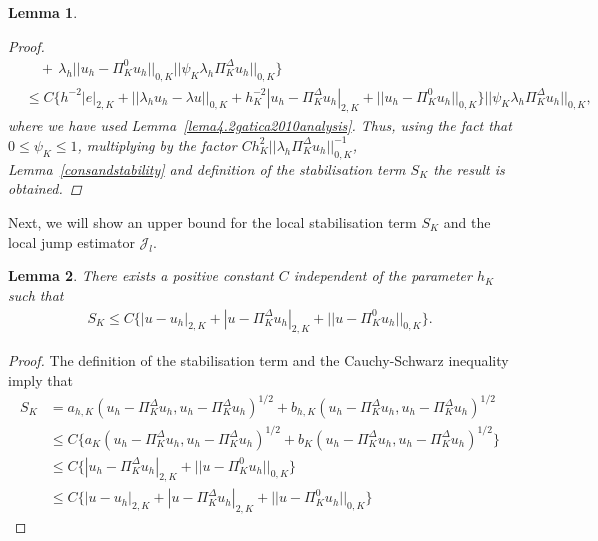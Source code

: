 \documentclass[final,reqno]{elsarticle}
\newtheorem{lemma}{Lemma}[section]
\def\PiK{\Pi_{K}^{\Delta}}
\begin{document}
\begin{lemma}
\begin{proof}
\begin{align}
			&\quad +\, \lambda_h ||u_h-\Pi_K^0 u_h ||_{0,K}||\psi_K \lambda_h \PiK u_h ||_{0,K}\Big\}\nonumber\\
			&\leq C\Big\{h^{-2}|e|_{2,K}+||\lambda_hu_h-\lambda u ||_{0,K}+h_K^{-2} |u_h-\PiK u_h|_{2,K}+||u_h-\Pi_K^0 u_h ||_{0,K}  \Big\}|| \psi_K\lambda_h\PiK u_h||_{0,K},\nonumber
		\end{align}
where we have used Lemma~\ref{lema4.2gatica2010analysis}. Thus, using the fact that $0\leq  \psi_K\leq 1$, multiplying by the factor $Ch_K^2||\lambda_h \PiK u_h ||_{0,K}^{-1}$, Lemma~\ref{consandstability} and definition of the stabilisation term $S_K$ the result is  obtained.
	\end{proof}
\end{lemma}

Next, we will show an upper bound for the local stabilisation term $S_K$ and the local jump estimator $\mathcal{J}_l$.
\begin{lemma}\label{theta12K_effic}
	There exists a positive constant $C$ independent of the parameter $h_K$ such that
	\begin{align*}
		S_K\leq C\Big\{|u-u_h|_{2,K}+|u-\PiK  u_h|_{2,K}+||u-\Pi_K^0  u_h||_{0,K} \Big\}.
	\end{align*}
\end{lemma}
\begin{proof} 
The definition of the stabilisation term and the Cauchy-Schwarz inequality imply that
\begin{align*}
S_K&=    a_{h,K}(u_h-\PiK u_h,u_h-\PiK u_h)^{1/2} + b_{h,K}(u_h-\PiK u_h,u_h-\PiK u_h)^{1/2}\\
&\leq C \Big\{a_{K}(u_h-\PiK u_h,u_h-\PiK u_h)^{1/2} + b_{K}(u_h-\PiK u_h,u_h-\PiK u_h)^{1/2}\Big\}\\
&\leq C \Big\{|u_h-\PiK u_h|_{2,K}+ ||u-\Pi_K^0u_h||_{0,K}  \Big\}
\\
&\leq C \Big\{ |u-u_h|_{2,K} + |u-\PiK u_h|_{2,K}+ ||u-\Pi_K^0u_h||_{0,K}  \Big\}
\end{align*}
\end{proof}
\end{document}
